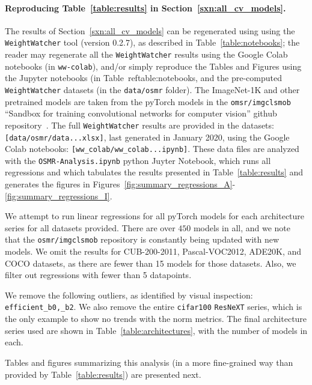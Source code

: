 \paragraph{Reproducing Table~\ref{table:results} in Section~\ref{sxn:all_cv_models}. }

The results of Section~\ref{sxn:all_cv_models} can be regenerated using
using the \texttt{WeightWatcher} tool (version 0.2.7), as described in Table~\ref{table:notebooks};
the reader may regenerate all the \texttt{WeightWatcher} results using the Google Colab notebooks (in \texttt{ww-colab}),
and/or simply reproduce the Tables and Figures using the Jupyter notebooks (in Table~ref{table:notebooks},
and the pre-computed \texttt{WeightWatcher} datasets (in the \texttt{data/osmr} folder).
The ImageNet-1K and other pretrained models are taken from the pyTorch models in the \texttt{omsr/imgclsmob} 
``Sandbox for training convolutional networks for computer vision'' github repository~\cite{osmr}.
The full  \texttt{WeightWatcher} results are provided in the datasets: \texttt{[data/osmr/data...xlsx]},
last generated in January 2020, using the Google Colab notebooks: \texttt{[ww\_colab/ww\_colab...ipynb]}.
These data files are analyzed with the \texttt{OSMR-Analysis.ipynb} python Juyter Notebook,
which runs all regressions and which tabulates the results presented in Table~\ref{table:results}
and generates the figures in Figures~\ref{fig:summary_regressions_A}-\ref{fig:summary_regressions_I}.

We attempt to run linear regressions for all pyTorch models for each architecture series for all datasets provided.  
There are over $450$ models in all, and we note that the \texttt{osmr/imgclsmob} repository is constantly being updated with new models.
We omit the results for CUB-200-2011, Pascal-VOC2012, ADE20K, and COCO datasets, as there are fewer than 15 models for those datasets.  
Also, we filter out regressions with fewer than 5 datapoints.

We remove the following outliers, as identified by visual inspection: \texttt{efficient\_b0,\_b2}.
We also remove the entire \texttt{cifar100} \texttt{ResNeXT} series, which is the only example to show no trends with the norm metrics.
%
The final architecture series used are shown in  Table~\ref{table:architectures}, with the number of models in each.

Tables and figures summarizing this analysis (in a more fine-grained way than provided by Table~\ref{table:results}) are presented next.


